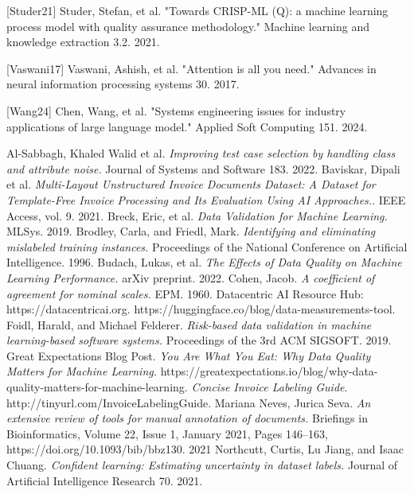 \documentclass[twocolumn]{article}
\begin{document}
[Studer21] Studer, Stefan, et al. "Towards CRISP-ML (Q): a machine learning process model with quality assurance methodology." Machine learning and knowledge extraction 3.2. 2021.

[Vaswani17] Vaswani, Ashish, et al. "Attention is all you need." Advances in neural information processing systems 30. 2017.

[Wang24] Chen, Wang, et al. "Systems engineering issues for industry applications of large language model." Applied Soft Computing 151. 2024.

\iffalse


\begin{thebibliography}{10}
\footnotesize
{} Al-Sabbagh, Khaled Walid et al. {\em Improving test case selection by handling class and attribute noise.} Journal of Systems and Software 183. 2022.
 Baviskar, Dipali et al. {\em Multi-Layout Unstructured Invoice Documents Dataset: A Dataset for Template-Free Invoice Processing and Its Evaluation Using AI Approaches.}. IEEE Access, vol. 9. 2021.
 Breck, Eric, et al. {\em Data Validation for Machine Learning.} MLSys. 2019.
 Brodley, Carla, and Friedl, Mark. {\em Identifying and eliminating mislabeled training instances.} Proceedings of the National Conference on Artificial Intelligence. 1996.
 Budach, Lukas, et al. {\em The Effects of Data Quality on Machine Learning Performance.} arXiv preprint. 2022.
 Cohen, Jacob. {\em A coefficient of agreement for nominal scales.} EPM. 1960.
 Datacentric AI Resource Hub: https://datacentricai.org. 
 https://huggingface.co/blog/data-measurements-tool. 
 Foidl, Harald, and Michael Felderer. {\em Risk-based data validation in machine learning-based software systems.} Proceedings of the 3rd ACM SIGSOFT. 2019.
 Great Expectations Blog Post. {\em You Are What You Eat: Why Data Quality Matters for Machine Learning.} https://greatexpectations.io/blog/why-data-quality-matters-for-machine-learning. 
 {\em Concise Invoice Labeling Guide}. http://tinyurl.com/InvoiceLabelingGuide. 
 Mariana Neves, Jurica Seva. {\em An extensive review of tools for manual annotation of documents.} Briefings in Bioinformatics, Volume 22, Issue 1, January 2021, Pages 146–163, https://doi.org/10.1093/bib/bbz130. 2021
 Northcutt, Curtis, Lu Jiang, and Isaac Chuang. {\em Confident learning: Estimating uncertainty in dataset labels.} Journal of Artificial Intelligence Research 70. 2021.

\end{thebibliography}
\end{document}
